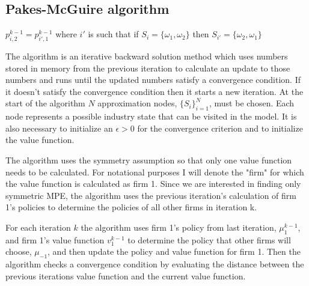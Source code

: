 \documentclass[12pt]{article}
\begin{document}
\subsection{Pakes-McGuire algorithm}


$p^{k-1}_{i,2}=p^{k-1}_{i',1}$ where $i'$ is such that if $S_i=\{\omega_1,\omega_2\}$ then $S_{i'}=\{\omega_2,\omega_1\}$

The \citet{1992_Pakes_McGuire_NBER} algorithm is an iterative backward solution method which uses numbers stored in memory from the previous iteration to calculate an update to those numbers and runs until the updated numbers satisfy a convergence condition. If it doesn't satisfy the convergence condition then it starts a new iteration. At the start of the algorithm $N$ approximation nodes, $\{S_i\}_{i=1}^N$, must be chosen. Each node represents a possible industry state that can be visited in the model. It is also necessary to initialize an $\epsilon>0$ for the convergence criterion and to initialize the value function.

The algorithm uses the symmetry assumption so that only one value function needs to be calculated. For notational purposes I will denote the "firm" for which the value function is calculated as firm 1. Since we are interested in finding only symmetric MPE, the \citet{1992_Pakes_McGuire_NBER} algorithm uses the previous iteration's calculation of firm 1's policies to determine the policies of all other firms in iteration k.

For each iteration $k$ the algorithm uses firm 1's  policy from last iteration, $\mu^{k-1}_1$, and firm 1's value function $v^{k-1}_1$ to determine the policy that other firms will choose, $\mu_{-1}$, and then update the policy and value function for firm 1. Then the algorithm checks a convergence condition by evaluating the distance between the previous iterations value function and the current value function.
\end{document}
